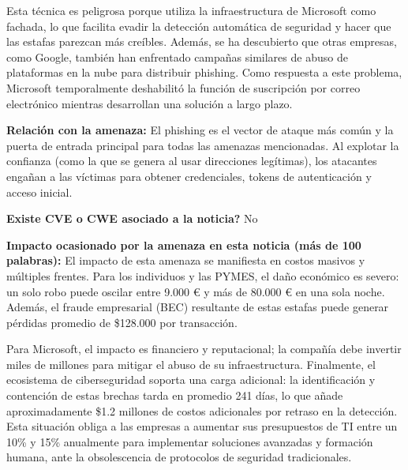 \begin{tcolorbox}
    Esta técnica es peligrosa porque utiliza la infraestructura de Microsoft como 
    fachada, lo que facilita evadir la detección automática de seguridad y hacer 
    que las estafas parezcan más creíbles. Además, se ha descubierto que otras empresas,
     como Google, también han enfrentado campañas similares de abuso de plataformas en 
     la nube para distribuir phishing. Como respuesta a este problema, Microsoft
      temporalmente deshabilitó la función de suscripción por correo electrónico 
      mientras desarrollan una solución a largo plazo.

    \textbf{Relación con la amenaza:}
    \vspace{0.5em}
    El phishing es el vector de ataque más común y la puerta de entrada principal 
    para todas las amenazas mencionadas. Al explotar la confianza (como la que se genera
     al usar direcciones legítimas), los atacantes engañan a las víctimas para obtener 
     credenciales, tokens de autenticación y acceso inicial.

    \textbf{\textquestiondown Existe CVE o CWE asociado a la noticia?}
    \vspace{0.5em}
    No

    \textbf{Impacto ocasionado por la amenaza en esta noticia (más de 100 palabras):}
    \vspace{0.5em}
    El impacto de esta amenaza se manifiesta en costos masivos y múltiples frentes.
    Para los individuos y las PYMES, el daño económico es severo: un solo robo puede 
    oscilar entre 9.000 € y más de 80.000 € en una sola noche. Además, el fraude 
    empresarial (BEC) resultante de estas estafas puede generar pérdidas promedio de
     \$128.000 por transacción.

Para Microsoft, el impacto es financiero y reputacional;
 la compañía debe invertir miles de millones para mitigar el abuso de su 
 infraestructura. Finalmente, el ecosistema de ciberseguridad soporta una carga 
 adicional: la identificación y contención de estas brechas tarda en promedio 241 días,
  lo que añade aproximadamente \$1.2 millones de costos adicionales por retraso en la
   detección. Esta situación obliga a las empresas a aumentar sus presupuestos de TI
    entre un 10\% y 15\% anualmente para implementar soluciones avanzadas y formación 
    humana, ante la obsolescencia de protocolos de seguridad tradicionales.

\end{tcolorbox}